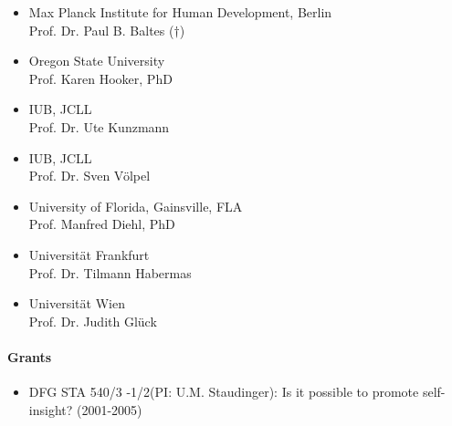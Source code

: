 \begin{itemize}
\item Max Planck Institute for Human Development, Berlin\\ Prof. Dr. Paul B. Baltes ($\dagger$)
\item Oregon State University\\ Prof. Karen Hooker, PhD
\item IUB, JCLL\\ Prof. Dr. Ute Kunzmann
\item IUB, JCLL\\ Prof. Dr. Sven V\"olpel
\item University of Florida, Gainsville, FLA\\ Prof. Manfred Diehl, PhD
\item Universit\"at Frankfurt\\ Prof. Dr. Tilmann Habermas
\item Universit\"at Wien\\ Prof. Dr. Judith Gl\"uck
\end{itemize}

\begin{bibunit}[apalike]
\nocite{*}
\putbib[profUrsulaStaudinger1]
\end{bibunit}

\paragraph{Grants}
\begin{itemize}
\item DFG STA 540/3 -1/2(PI: U.M. Staudinger): Is it possible to promote self-insight? (2001-2005)
\end{itemize}